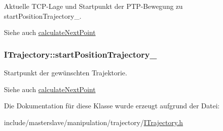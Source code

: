 Aktuelle T\-C\-P-\/\-Lage und Startpunkt der P\-T\-P-\/\-Bewegung zu start\-Position\-Trajectory\-\_\-. 

\begin{DoxySeeAlso}{Siehe auch}
\hyperlink{classITrajectory_a7baff9fb2fc20987e9469d736a90406b}{calculate\-Next\-Point} 
\end{DoxySeeAlso}
\hypertarget{classITrajectory_a6884ba58490bcce750b698c2da8bc7bc}{
\subsubsection[{start\-Position\-Trajectory\-\_\-}]{\setlength{\rightskip}{0pt plus 5cm}I\-Trajectory\-::start\-Position\-Trajectory\-\_\-\hspace{0.3cm}{\ttfamily [protected]}}}\label{classITrajectory_a6884ba58490bcce750b698c2da8bc7bc}


Startpunkt der gewünschten Trajektorie. 

\begin{DoxySeeAlso}{Siehe auch}
\hyperlink{classITrajectory_a7baff9fb2fc20987e9469d736a90406b}{calculate\-Next\-Point} 
\end{DoxySeeAlso}


Die Dokumentation für diese Klasse wurde erzeugt aufgrund der Datei\-:\begin{DoxyCompactItemize}
\item 
include/masterslave/manipulation/trajectory/\hyperlink{ITrajectory_8h}{I\-Trajectory.\-h}\end{DoxyCompactItemize}
